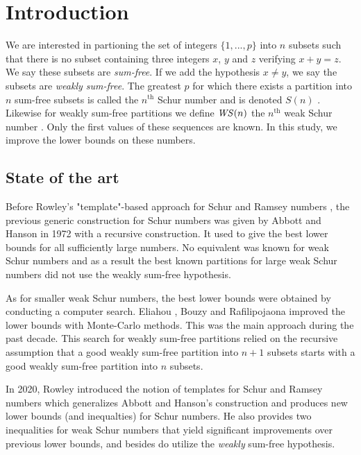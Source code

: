 \section{Introduction}

\qquad We are interested in partioning the set of integers \(\{1, ..., p\}\) into \(n\) subsets such that there is no 
subset containing three integers \(x\), \(y\) and \(z\) verifying \(x + y = z\). We say these subsets are 
\textit{sum-free}. If we add the hypothesis \(x \neq y\), we say the subsets are \textit{weakly sum-free}. The 
greatest \(p\) for which there exists a partition into \(n\) sum-free subsets is called the \(n^{\text{th}}\) Schur 
number and is denoted \(S(n)\) \cite{Schur1917}. Likewise for weakly sum-free partitions we define \(\mathit{WS}(n)\) 
the \(n^{\text{th}}\) weak Schur number \cite{Irving1973}. Only the first values of these sequences are known. 
In this study, we improve the lower bounds on these numbers.


\subsection{State of the art}

\qquad Before Rowley's "template"-based approach for Schur and Ramsey numbers \cite{RowleyRamsey}, the 
previous generic construction for Schur numbers was given by Abbott and Hanson \cite{AbbottHanson} in 1972 
with a recursive construction. It used to give the best lower bounds for all sufficiently large numbers. No equivalent 
was known for weak Schur numbers and as a result the best known partitions for large weak Schur numbers 
did not use the weakly sum-free hypothesis. 

\par
As for smaller weak Schur numbers, the best lower bounds were obtained by conducting a computer search. Eliahou 
\cite{EliahouBook}, Bouzy \cite{Bouzy2015AnAP} and Rafilipojaona \cite{Rafilipojaona} improved the lower 
bounds with Monte-Carlo methods. This was the main approach during the past decade. This search for weakly 
sum-free partitions relied on the recursive assumption that a good weakly sum-free partition into \(n+1\) subsets 
starts with a good weakly sum-free partition into \(n\) subsets. 

\par
In 2020, Rowley introduced the notion of templates for Schur and Ramsey numbers \cite{RowleyRamsey} which 
generalizes Abbott and Hanson's construction and produces new lower bounds (and inequalties) for Schur numbers. 
He also provides two inequalities for weak Schur numbers \cite{RowleyWS} that yield significant improvements 
over previous lower bounds, and besides do utilize the \textit{weakly} sum-free hypothesis.

